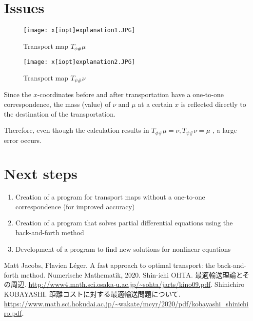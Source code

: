 \documentclass[a4j,10pt, twocolumn, dvipdfmx]{article}
\theoremstyle{definition}
\begin{document}
\section{Issues}

\begin{figure}[htbp]
    \begin{center}
        \texttt{[image: x[iopt]explanation1.JPG]}
        \caption{Transport map $T_{\phi \#} \mu$}
        \texttt{[image: x[iopt]explanation2.JPG]}
        \caption{Transport map $T_{\psi \#} \nu$}
    \end{center}
\end{figure}
\label{x[iopt]explanation}

Since the $x$-coordinates before and after transportation have a one-to-one correspondence, 
the mass (value) of $\nu$ and $\mu$ at a certain $x$ is reflected directly to the destination of the transportation.

Therefore, even though the calculation results in $T_{\phi \#} \mu = \nu, T_{\psi \#} \nu = \mu$ , a large error occurs.
\section{Next steps}
\begin{enumerate}
    \item Creation of a program for transport maps without a one-to-one correspondence (for improved accuracy)
    \item Creation of a program that solves partial differential equations using the back-and-forth method
    \item Development of a program to find new solutions for nonlinear equations
\end{enumerate}


\begin{thebibliography}{99}
    Matt Jacobs, Flavien Léger.
    \newblock A fast approach to optimal transport: the back-and-forth method.
    \newblock Numerische Mathematik, 2020. 
    Shin-ichi OHTA.
    \newblock 最適輸送理論とその周辺.
    \newblock \url{http://www4.math.sci.osaka-u.ac.jp/~sohta/jarts/kino09.pdf}.
    Shinichiro KOBAYASHI.
    \newblock 距離コストに対する最適輸送問題について.
    \newblock \url{https://www.math.sci.hokudai.ac.jp/~wakate/mcyr/2020/pdf/kobayashi_shinichiro.pdf}.

    \end{thebibliography}
\end{document}
